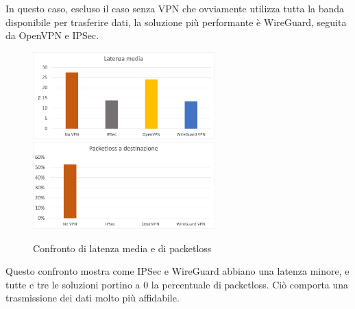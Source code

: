 In questo caso, escluso il caso senza VPN che ovviamente utilizza tutta la banda disponibile per trasferire dati, la soluzione più performante è WireGuard, seguita da OpenVPN e IPSec.


\begin{figure}[ht]
    \centering
    \includegraphics[width=7cm]{figure/avgLat.png}
    \includegraphics[width=7cm]{figure/packetloss.png}
    \caption{Confronto di latenza media e di packetloss}
\end{figure}

Questo confronto mostra come IPSec e WireGuard abbiano una latenza minore, e tutte e tre le soluzioni portino a 0 la percentuale di packetloss. Ciò comporta una trasmissione dei dati molto più affidabile.


